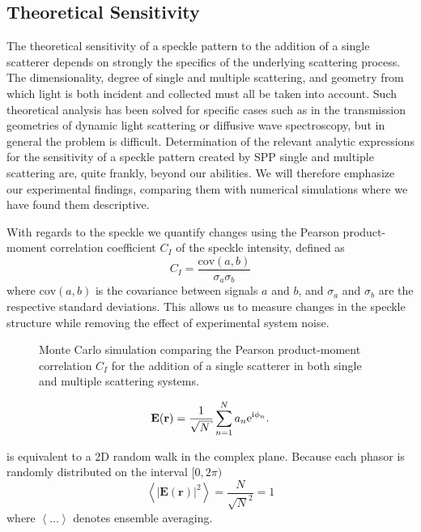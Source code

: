 \subsection{Theoretical Sensitivity}
The theoretical sensitivity of a speckle pattern to the addition of a
single scatterer depends on strongly the specifics of the underlying
scattering process.  The dimensionality, degree of single and multiple
scattering, and geometry from which light is both incident and collected
must all be taken into account.  Such theoretical analysis has been solved
for specific cases such as in the transmission geometries of dynamic light
scattering or diffusive wave spectroscopy, but in general the problem is
difficult.  Determination of the relevant analytic expressions for the
sensitivity of a speckle pattern created by SPP single and multiple
scattering are, quite frankly, beyond our abilities.  We will therefore
emphasize our experimental findings, comparing them with numerical
simulations where we have found them descriptive.

With regards to the speckle we quantify changes using the Pearson
product-moment correlation coefficient $C_I$ of the speckle intensity,
defined as 
\begin{equation}
C_I = \frac{\mathrm{cov}(a,b)}{\sigma_a \sigma_b}
\end{equation}
where $\mathrm{cov}(a,b)$ is the covariance between signals $a$ and $b$,
and $\sigma_a$ and $\sigma_b$ are the respective standard deviations.  This
allows us to measure changes in the speckle structure while removing the
effect of experimental system noise.

\begin{figure}
\centering
\caption{Monte Carlo simulation comparing the Pearson product-moment
				correlation $C_I$ for the addition of a single scatterer in both
				single and multiple scattering systems.}
\label{fig:scatteringpearson}
\end{figure}


\begin{equation}
\mathbf{E}(\mathbf{r}) = \frac{1}{\sqrt{N}} \sum_{n=1}^{N} a_n \me^{\mi \phi_n}.
\label{eqn:phasorsumdingus}
\end{equation}

 is equivalent to a 2D random walk in the
complex plane.  Because each phasor is randomly distributed on the interval
$[0,2\pi)$
\begin{equation}
\left<|\mathbf{E}(\mathbf{r})|^2\right> = \frac{N}{\sqrt{N}^2} = 1
\end{equation}
where $\left<\dots\right>$ denotes ensemble averaging.  

